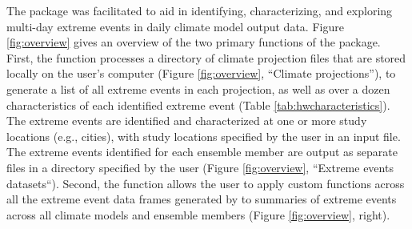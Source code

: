The  package was facilitated to aid in identifying,
characterizing, and exploring multi-day extreme events in daily climate
model output data. Figure \ref{fig:overview} gives an overview of the
two primary functions of the  package. First, the
 function processes a directory of climate projection
files that are stored locally on the user's computer (Figure
\ref{fig:overview}, ``Climate projections''), to generate a list of all
extreme events in each projection, as well as over a dozen
characteristics of each identified extreme event (Table
\ref{tab:hwcharacteristics}). The extreme events are identified and
characterized at one or more study locations (e.g., cities), with study
locations specified by the user in an input file. The extreme events
identified for each ensemble member are output as separate files in a
directory specified by the user (Figure \ref{fig:overview}, ``Extreme
events datasets``). Second, the  function
allows the user to apply custom functions across all the extreme event
data frames generated by  to summaries of extreme
events across all climate models and ensemble members (Figure
\ref{fig:overview}, right).

